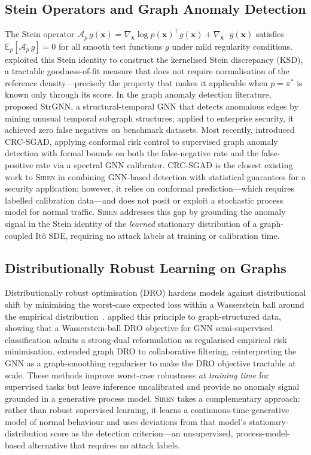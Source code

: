 \subsection{Stein Operators and Graph Anomaly Detection}

The Stein operator $\mathcal{A}_{p}\,g(\mathbf{x})
= \nabla_{\mathbf{x}}\!\log p(\mathbf{x})^\top g(\mathbf{x})
  + \nabla_{\mathbf{x}}\!\cdot\! g(\mathbf{x})$
satisfies $\mathbb{E}_{p}[\mathcal{A}_{p}\,g] = 0$ for all smooth test
functions $g$ under mild regularity conditions.
\citet{Liu2016ksd} exploited this Stein identity to construct the kernelised
Stein discrepancy (KSD), a tractable goodness-of-fit measure that does not
require normalisation of the reference density---precisely the property that
makes it applicable when $p = \pi^{*}$ is known only through its score.
In the graph anomaly detection literature, \citet{Cai2021strgnn} proposed
StrGNN, a structural-temporal GNN that detects anomalous edges by mining
unusual temporal subgraph structures; applied to enterprise security, it
achieved zero false negatives on benchmark datasets.
Most recently, \citet{Bai2025crcsgad} introduced CRC-SGAD, applying
conformal risk control to supervised graph anomaly detection with formal
bounds on both the false-negative rate and the false-positive rate via a
spectral GNN calibrator.
CRC-SGAD is the closest existing work to \textsc{Siren} in combining
GNN-based detection with statistical guarantees for a security application;
however, it relies on conformal prediction---which requires labelled
calibration data---and does not posit or exploit a stochastic process model
for normal traffic.
\textsc{Siren} addresses this gap by grounding the anomaly signal in the
Stein identity of the \emph{learned} stationary distribution of a
graph-coupled It\^o SDE, requiring no attack labels at training or
calibration time.

\subsection{Distributionally Robust Learning on Graphs}

Distributionally robust optimisation (DRO) hardens models against
distributional shift by minimising the worst-case expected loss within a
Wasserstein ball around the empirical distribution~\citep{Sinha2018wrm}.
\citet{Sadeghi2021drognn} applied this principle to graph-structured data,
showing that a Wasserstein-ball DRO objective for GNN semi-supervised
classification admits a strong-dual reformulation as regularised empirical
risk minimisation.
\citet{Wang2024drgnn} extended graph DRO to collaborative filtering,
reinterpreting the GNN as a graph-smoothing regulariser to make the DRO
objective tractable at scale.
These methods improve worst-case robustness \emph{at training time} for
supervised tasks but leave inference uncalibrated and provide no anomaly
signal grounded in a generative process model.
\textsc{Siren} takes a complementary approach: rather than robust supervised
learning, it learns a continuous-time generative model of normal behaviour
and uses deviations from that model's stationary-distribution score as the
detection criterion---an unsupervised, process-model-based alternative that
requires no attack labels.